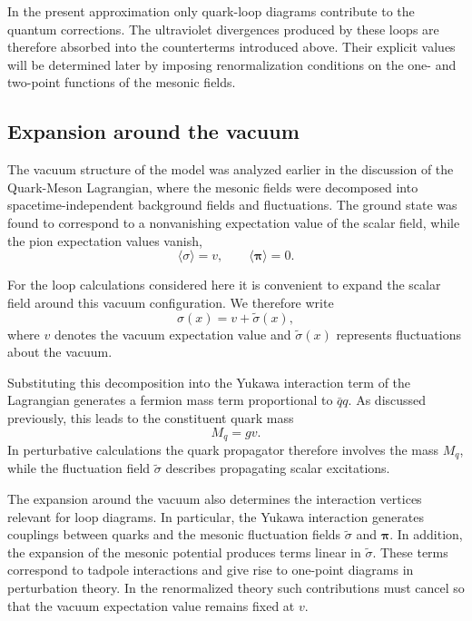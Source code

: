 In the present approximation only quark-loop diagrams contribute to
the quantum corrections. The ultraviolet divergences produced by
these loops are therefore absorbed into the counterterms introduced
above. Their explicit values will be determined later by imposing
renormalization conditions on the one- and two-point functions of the
mesonic fields.

\subsection{Expansion around the vacuum}

The vacuum structure of the model was analyzed earlier in the discussion
of the Quark-Meson Lagrangian, where the mesonic fields were decomposed
into spacetime-independent background fields and fluctuations. The
ground state was found to correspond to a nonvanishing expectation
value of the scalar field, while the pion expectation values vanish,
\begin{equation}
\langle \sigma \rangle = v,
\qquad
\langle \boldsymbol{\pi} \rangle = 0 .
\end{equation}

For the loop calculations considered here it is convenient to expand
the scalar field around this vacuum configuration. We therefore write
\begin{equation}
\sigma(x) = v + \tilde{\sigma}(x),
\end{equation}
where $v$ denotes the vacuum expectation value and
$\tilde{\sigma}(x)$ represents fluctuations about the vacuum.

Substituting this decomposition into the Yukawa interaction term of
the Lagrangian generates a fermion mass term proportional to
$\bar q q$. As discussed previously, this leads to the constituent
quark mass
\begin{equation}
M_q = g v .
\end{equation}
In perturbative calculations the quark propagator therefore involves
the mass $M_q$, while the fluctuation field $\tilde{\sigma}$ describes
propagating scalar excitations.

The expansion around the vacuum also determines the interaction
vertices relevant for loop diagrams. In particular, the Yukawa
interaction generates couplings between quarks and the mesonic
fluctuation fields $\tilde{\sigma}$ and $\boldsymbol{\pi}$. In
addition, the expansion of the mesonic potential produces terms
linear in $\tilde{\sigma}$. These terms correspond to tadpole
interactions and give rise to one-point diagrams in perturbation
theory. In the renormalized theory such contributions must cancel so
that the vacuum expectation value remains fixed at $v$.

